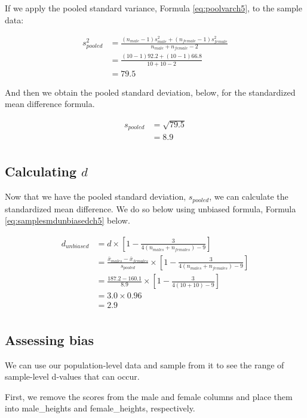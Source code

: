 \documentclass[
]{krantz}
\begin{document}
If we apply the pooled standard variance, Formula \eqref{eq:poolvarch5}, to the sample data:

\[
\begin{aligned}
s_{pooled}^2 &= \frac{(n_{male} -1)s_{male}^2 + (n_{female} -1)s_{female}^2}{n_{male} + n_{female}-2} \\
&= \frac{(10 -1)92.2 + (10 -1)66.8}{10 + 10 -2} \\
&= 79.5
\end{aligned}
\]

And then we obtain the pooled standard deviation, below, for the standardized mean difference formula.

\[
\begin{aligned} 
s_{pooled}  &= \sqrt{79.5} \\
&= 8.9\\
\end{aligned} 
\]

\hypertarget{calculating-d}{%
\subsection{\texorpdfstring{Calculating \(d\)}{Calculating d}}\label{calculating-d}}

Now that we have the pooled standard deviation, \(s_{pooled}\), we can calculate the standardized mean difference. We do so below using unbiased formula, Formula \eqref{eq:samplesmdunbiasedch5} below.

\[
\begin{aligned}
d_{unbiased}  &= d \times [1 - \frac{3}{4(n_{males} + n_{females})-9}] \\
&= \frac{\bar{x}_{males} - \bar{x}_{females}}{s_{pooled}} \times [1 - \frac{3}{4(n_{males} + n_{females})-9}] \\
&= \frac{187.2 - 160.1}{8.9} \times [1 - \frac{3}{4(10 + 10)-9}] \\
&= 3.0 \times 0.96\\
&= 2.9\\
\end{aligned}
\]

\hypertarget{assessing-bias}{%
\subsection{Assessing bias}\label{assessing-bias}}

We can use our population-level data and sample from it to see the range of sample-level d-values that can occur.

First, we remove the scores from the male and female columns and place them into male\_heights and female\_heights, respectively.
\end{document}
